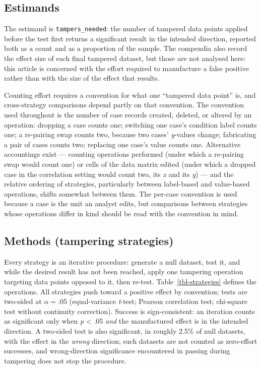 \documentclass[
  nonatbib,
  authoryear,
  preprint]{elsarticle}
\begin{document}
\subsection{Estimands}\label{estimands}

The estimand is \texttt{tampers\_needed}: the number of tampered data
points applied before the test first returns a significant result in the
intended direction, reported both as a count and as a proportion of the
sample. The compendia also record the effect size of each final tampered
dataset, but those are not analysed here: this article is concerned with
the effort required to manufacture a false positive rather than with the
size of the effect that results.

Counting effort requires a convention for what one ``tampered data
point'' is, and cross-strategy comparisons depend partly on that
convention. The convention used throughout is the number of case records
created, deleted, or altered by an operation: dropping a case counts
one; switching one case's condition label counts one; a re-pairing swap
counts two, because two cases' \emph{y}-values change; fabricating a
pair of cases counts two; replacing one case's value counts one.
Alternative accountings exist --- counting operations performed (under
which a re-pairing swap would count one) or cells of the data matrix
edited (under which a dropped case in the correlation setting would
count two, its \emph{x} and its \emph{y}) --- and the relative ordering
of strategies, particularly between label-based and value-based
operations, shifts somewhat between them. The per-case convention is
used because a case is the unit an analyst edits, but comparisons
between strategies whose operations differ in kind should be read with
the convention in mind.

\subsection{Methods (tampering
strategies)}\label{methods-tampering-strategies}

Every strategy is an iterative procedure: generate a null dataset, test
it, and while the desired result has not been reached, apply one
tampering operation targeting data points opposed to it, then re-test.
Table~\ref{tbl-strategies} defines the operations. All strategies push
toward a positive effect by convention; tests are two-sided at
\(\alpha = .05\) (equal-variance \emph{t}-test; Pearson correlation
test; chi-square test without continuity correction). Success is
sign-consistent: an iteration counts as significant only when \emph{p}
\textless{} .05 \emph{and} the manufactured effect is in the intended
direction. A two-sided test is also significant, in roughly 2.5\% of
null datasets, with the effect in the \emph{wrong} direction; such
datasets are not counted as zero-effort successes, and wrong-direction
significance encountered in passing during tampering does not stop the
procedure.
\end{document}
